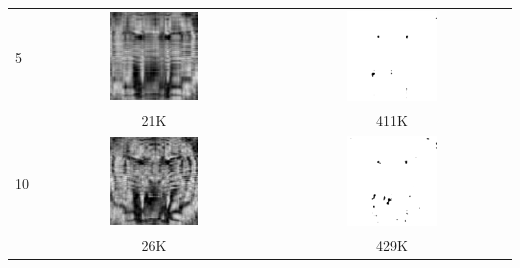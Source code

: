 \begin{center}
\begin{longtable}{|l|c|c|}
        \hline
        5 & \includegraphics[width=0.4\textwidth]{photos/photo_5.jpg} & \includegraphics[width=0.4\textwidth]{photos/photo_5.png} \\
        & 21K & 411K \\
        \hline
        10 & \includegraphics[width=0.4\textwidth]{photos/photo_10.jpg} & \includegraphics[width=0.4\textwidth]{photos/photo_10.png} \\
        & 26K & 429K \\

\end{longtable}
\end{center}
